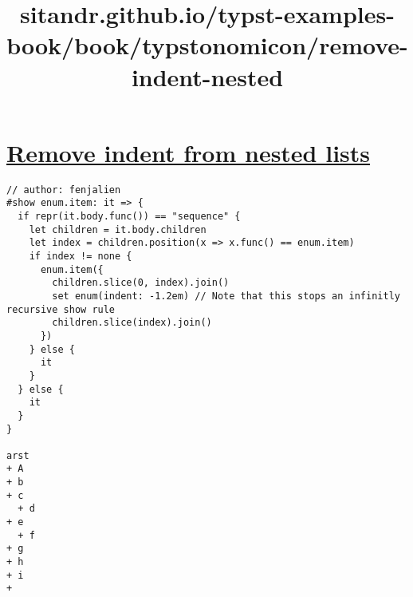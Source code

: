 \title{sitandr.github.io/typst-examples-book/book/typstonomicon/remove-indent-nested}

\section{\texorpdfstring{\hyperref[remove-indent-from-nested-lists]{Remove
indent from nested
lists}}{Remove indent from nested lists}}\label{remove-indent-from-nested-lists}

\begin{verbatim}
// author: fenjalien
#show enum.item: it => {
  if repr(it.body.func()) == "sequence" {
    let children = it.body.children
    let index = children.position(x => x.func() == enum.item)
    if index != none {
      enum.item({
        children.slice(0, index).join()
        set enum(indent: -1.2em) // Note that this stops an infinitly recursive show rule
        children.slice(index).join()
      })
    } else {
      it
    }
  } else {
    it
  }
}

arst
+ A
+ b
+ c
  + d
+ e
  + f
+ g
+ h
+ i
+ 
\end{verbatim}

\pandocbounded{}
